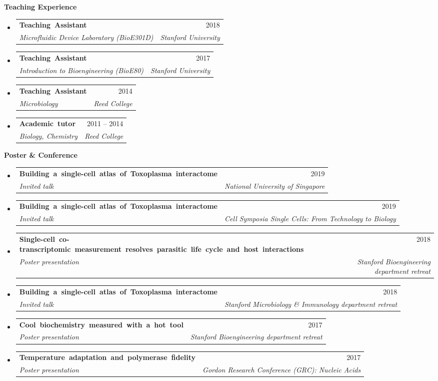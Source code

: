 \documentclass[letterpaper,12pt]{article}[leftmargin=*]
\makeatletter
\def \entryspacing {-0pt}
\renewcommand{\section}[2]{\vspace{5pt}
  \colorbox{secondary}{\color{white}\raggedbottom\normalsize\textbf{{#1}{\hspace{7pt}#2}}}
}
\newcommand{\resumeEntryStart}{\begin{itemize}[leftmargin=2.5mm]}
\newcommand{\resumeEntryEnd}{\end{itemize}\vspace{\entryspacing}}
\newcommand{\resumeEntryTSDL}[4]{
  \vspace{-1pt}\item[]
    \begin{tabularx}{0.97\textwidth}{X@{\hspace{40pt}}r}
      \mbox{\textbf{\color{primary}#1}} & {\firabook\color{accent}\small#2} \\
      \textit{\color{accent}\small#3} & \textit{\color{accent}\small#4} \\
    \end{tabularx}\vspace{-8pt}
}
\makeatother
\begin{document}
\section{\faUsers}{Teaching Experience}

  \resumeEntryStart
    \resumeEntryTSDL
      {Teaching Assistant}{2018}
      {Microfluidic Device Laboratory (BioE301D)}{Stanford University}
    \resumeEntryTSDL
      {Teaching Assistant}{2017}
      {Introduction to Bioengineering (BioE80)}{Stanford University}
    \resumeEntryTSDL
      {Teaching Assistant}{2014}
      {Microbiology}{Reed College}
    \resumeEntryTSDL
      {Academic tutor}{2011 -- 2014}
      {Biology, Chemistry}{Reed College}
  \resumeEntryEnd

\section{\faSlideshare}{Poster \& Conference}

  \resumeEntryStart
    \resumeEntryTSDL
      {Building a single-cell atlas of Toxoplasma interactome}{2019}
      {Invited talk}{National University of Singapore}
    \resumeEntryTSDL
      {Building a single-cell atlas of Toxoplasma interactome}{2019}
      {Invited talk}{Cell Symposia Single Cells: From Technology to Biology}
    \resumeEntryTSDL
      {Single-cell co-transcriptomic measurement resolves parasitic life cycle and host interactions}{2018}
      {Poster presentation}{Stanford Bioengineering department retreat}
    \resumeEntryTSDL
      {Building a single-cell atlas of Toxoplasma interactome}{2018}
      {Invited talk}{Stanford Microbiology \& Immunology department retreat}
    \resumeEntryTSDL
      {Cool biochemistry measured with a hot tool}{2017}
      {Poster presentation}{Stanford Bioengineering department retreat}
    \resumeEntryTSDL
      {Temperature adaptation and polymerase fidelity}{2017}
      {Poster presentation}{Gordon Research Conference (GRC): Nucleic Acids}

  \resumeEntryEnd


\end{document}
